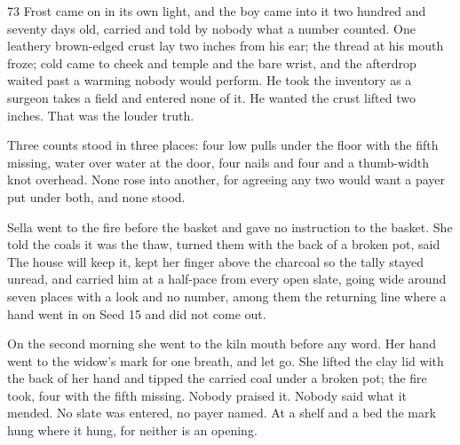 
\scenebreak


\scenebreak


\scenebreak

\CRtailpiece
\begin{CRchronicle}{73}
Frost came on in its own light, and the boy came into it two hundred and seventy days old, carried and told by nobody what a number counted. One leathery brown-edged crust lay two inches from his ear; the thread at his mouth froze; cold came to cheek and temple and the bare wrist, and the afterdrop waited past a warming nobody would perform. He took the inventory as a surgeon takes a field and entered none of it. He wanted the crust lifted two inches. That was the louder truth.

Three counts stood in three places: four low pulls under the floor with the fifth missing, water over water at the door, four nails and four and a thumb-width knot overhead. None rose into another, for agreeing any two would want a payer put under both, and none stood.

Sella went to the fire before the basket and gave no instruction to the basket. She told the coals it was the thaw, turned them with the back of a broken pot, said The house will keep it, kept her finger above the charcoal so the tally stayed unread, and carried him at a half-pace from every open slate, going wide around seven places with a look and no number, among them the returning line where a hand went in on Seed 15 and did not come out.

On the second morning she went to the kiln mouth before any word. Her hand went to the widow’s mark for one breath, and let go. She lifted the clay lid with the back of her hand and tipped the carried coal under a broken pot; the fire took, four with the fifth missing. Nobody praised it. Nobody said what it mended. No slate was entered, no payer named. At a shelf and a bed the mark hung where it hung, for neither is an opening.


\end{CRchronicle}
